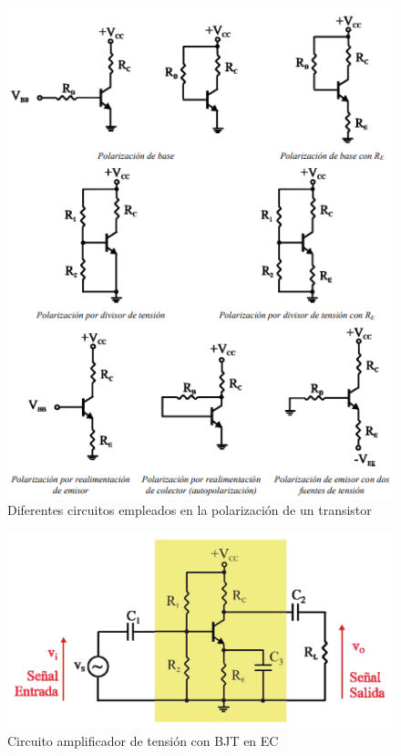 \begin{figure}[H]
    \centering
    \includegraphics[width=\textwidth]{Imagenes/polarizacion.png}
    \caption{Diferentes circuitos empleados en la polarización de un transistor}
    \label{fig:polarizacion}
\end{figure}

\begin{figure}[H]
    \centering
    \includegraphics[width=\textwidth]{Imagenes/bjt_ec.png}
    \caption{Circuito amplificador de tensión con BJT en EC}
    \label{fig:ec}
\end{figure}

